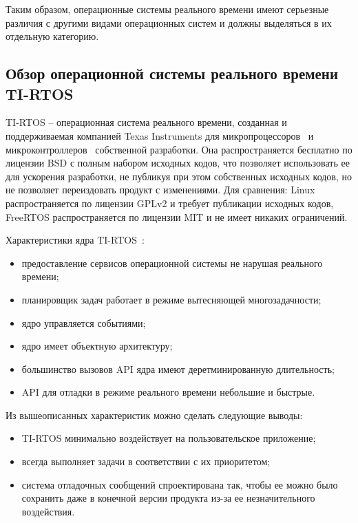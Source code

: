 Таким образом, операционные системы реального времени имеют серьезные различия
с другими видами операционных систем и должны выделяться в их отдельную
категорию.

\subsection{Обзор операционной системы реального времени TI-RTOS}

TI-RTOS -- операционная система реального времени, созданная и поддерживаемая
компанией Texas Instruments для микропроцессоров~\cite{tirtos_proc_site} и
микроконтроллеров~\cite{tirtos_mcu_site} собственной разработки. Она
распространяется бесплатно по лицензии BSD с полным набором исходных кодов,
что позволяет использовать ее для ускорения разработки,
не публикуя при этом собственных исходных кодов, но не позволяет переиздовать
продукт с изменениями. Для сравнения:
Linux распространяется по лицензии GPLv2 и требует публикации
исходных кодов, FreeRTOS распространяется по лицензии MIT и не имеет никаких
ограничений.

Характеристики ядра TI-RTOS~\cite{ma_tirtos_kernel}:
\begin{itemize}
    \item предоставление сервисов операционной системы не нарушая реального времени;
    \item планировщик задач работает в режиме вытесняющей многозадачности;
    \item ядро управляется событиями;
    \item ядро имеет объектную архитектуру;
    \item большинство вызовов API ядра имеют деретминированную длительность;
    \item API для отладки в режиме реального времени небольшие и быстрые.
\end{itemize}

Из вышеописанных характеристик можно сделать следующие выводы:
\begin{itemize}
    \item TI-RTOS минимально воздействует на пользовательское приложение;
    \item всегда выполняет задачи в соответствии с их приоритетом;
    \item система отладочных сообщений спроектирована так, чтобы ее можно было
        сохранить даже в конечной версии продукта из-за ее незначительного воздействия.
\end{itemize}

